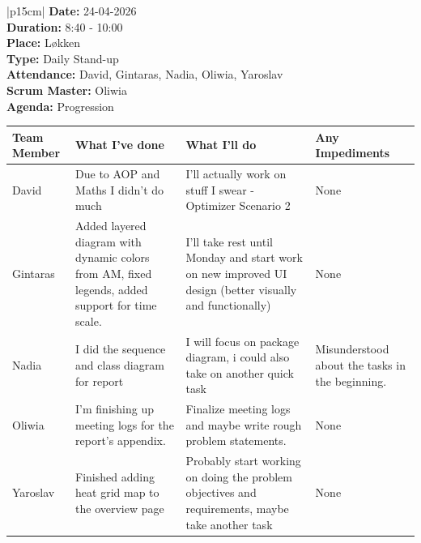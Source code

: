 \begin{table}[H]
    \centering
    \begin{tabular}{|p{15cm}|}   
        \hline
        \textbf{Date:}  24-04-2026 \\
        \textbf{Duration:} 8:40 - 10:00 \\
        \textbf{Place:}  Løkken \\
        \textbf{Type:} Daily Stand-up \\
        \textbf{Attendance:} David, Gintaras, Nadia, Oliwia, Yaroslav \\
        \textbf{Scrum Master:}  Oliwia \\
        \textbf{Agenda:} Progression
        \begin{table}[H]
            \begin{tabular}{|p{1.75cm}|p{4cm}|p{4cm}|p{4cm}|}
                \hline
                \cellcolor[HTML]{BFBFBF}  \textbf{Team Member} & \cellcolor[HTML]{BFBFBF}  \textbf{What I've done} & \cellcolor[HTML]{BFBFBF}  \textbf{What I'll do} & \cellcolor[HTML]{BFBFBF}  \textbf{Any Impediments}\\
                \hline
                \cellcolor[HTML]{d4d4d4} David & Due to AOP and Maths I didn't do much & I'll actually work on stuff I swear - Optimizer Scenario 2 & None \\
                \hline
                \cellcolor[HTML]{d4d4d4} Gintaras & Added layered diagram with dynamic colors from AM, fixed legends, added support for time scale. & I'll take rest until Monday and start work on new improved UI design (better visually and functionally) & None \\
                \hline
                \cellcolor[HTML]{d4d4d4} Nadia & I did the sequence and class diagram for report & I will focus on package diagram, i could also take on another quick task  & Misunderstood about the tasks in the beginning. \\
                \hline
                \cellcolor[HTML]{d4d4d4} Oliwia & I’m finishing up meeting logs for the report’s appendix. & Finalize meeting logs and maybe write rough problem statements. & None \\
                \hline
                \cellcolor[HTML]{d4d4d4} Yaroslav & Finished adding heat grid map to the overview page & Probably start working on doing the problem objectives and requirements, maybe take another task & None \\
                \hline
            \end{tabular}
        \end{table}
        \\
        \hline
    \end{tabular}
\end{table}

